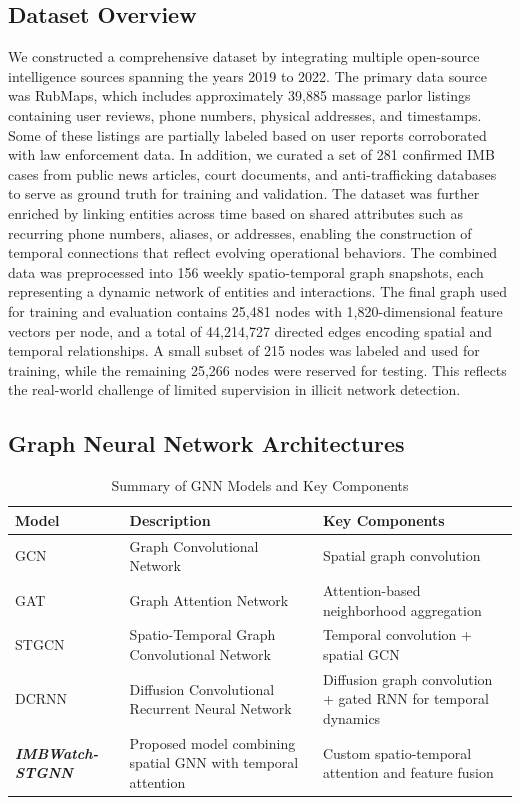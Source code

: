 \documentclass[letterpaper]{article} %
\begin{document}
\subsection{Dataset Overview}

We constructed a comprehensive dataset by integrating multiple open-source intelligence sources spanning the years 2019 to 2022. The primary data source was RubMaps, which includes approximately 39,885 massage parlor listings containing user reviews, phone numbers, physical addresses, and timestamps. Some of these listings are partially labeled based on user reports corroborated with law enforcement data. In addition, we curated a set of 281 confirmed IMB cases from public news articles, court documents, and anti-trafficking databases to serve as ground truth for training and validation. The dataset was further enriched by linking entities across time based on shared attributes such as recurring phone numbers, aliases, or addresses, enabling the construction of temporal connections that reflect evolving operational behaviors. The combined data was preprocessed into 156 weekly spatio-temporal graph snapshots, each representing a dynamic network of entities and interactions. The final graph used for training and evaluation contains 25,481 nodes with 1,820-dimensional feature vectors per node, and a total of 44,214,727 directed edges encoding spatial and temporal relationships. A small subset of 215 nodes was labeled and used for training, while the remaining 25,266 nodes were reserved for testing. This reflects the real-world challenge of limited supervision in illicit network detection.

\subsection{Graph Neural Network Architectures}

\begin{table}[!ht]
\centering
\caption{Summary of GNN Models and Key Components}
\label{tab:model_description}
\renewcommand{\arraystretch}{1.2} %
\begin{tabular}{l p{5.5cm} p{5.5cm}}
\hline
\textbf{Model} & \textbf{Description} & \textbf{Key Components} \\
\hline
GCN & Graph Convolutional Network \cite{kipf2017semi} & Spatial graph convolution \\
GAT & Graph Attention Network \cite{velickovic2018graph} & Attention-based neighborhood aggregation \\
STGCN & Spatio-Temporal Graph Convolutional Network \cite{yu2018spatio} & Temporal convolution + spatial GCN \\
DCRNN & Diffusion Convolutional Recurrent Neural Network \cite{li2018diffusion} & Diffusion graph convolution + gated RNN for temporal dynamics \\
\textbf{\textit{IMBWatch-STGNN}} & Proposed model combining spatial GNN with temporal attention & Custom spatio-temporal attention and feature fusion \\
\hline
\end{tabular}
\end{table}
\end{document}
